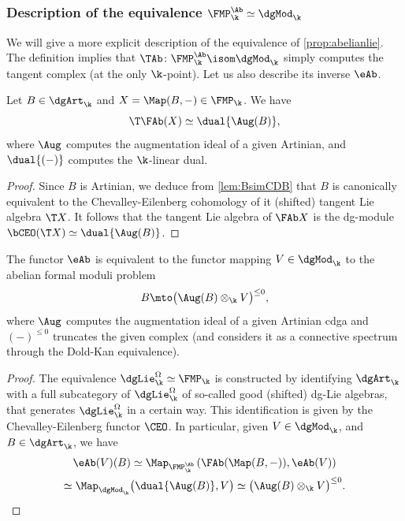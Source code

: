 \subsubsection{Description of the equivalence $\FMP_\k^\Ab \simeq \dgMod_\k$}

We will give a more expli\-cit description of the equivalence of \autoref{prop:abelianlie}. The definition implies that $\TAb \colon \FMP_\k^\Ab \isom \dgMod_\k$ simply computes the tangent complex (at the only $\k$\nobreakdash-point). Let us also describe its inverse $\eAb$.

\begin{lem}\label{lem:abelianization}
Let $B \in \dgArt_\k$ and $X = \Map(B,-) \in \FMP_\k$.
We have
\[
\T \FAb(X) \simeq \dual{\Aug(B)},
\]
where $\Aug$ computes the augmentation ideal of a given Artinian, and $\dual{(-)}$ computes the $\k$-linear dual.
\end{lem}

\begin{proof}
Since $B$ is Artinian, we deduce from \autoref{lem:BsimCDB} that $B$ is canonically equivalent to the Chevalley-Eilenberg cohomology of it (shifted) tangent Lie algebra $\T X$.
It follows that the tangent Lie algebra of $\FAb X$ is the dg-module $\bCEO(\T X) \simeq \dual{\Aug (B)}$.
\end{proof}

\begin{prop}\label{prop:calceAb}
The functor $\eAb$ is equivalent to the functor mapping $V \in \dgMod_\k$ to the abelian formal moduli problem
\[
B \mto \bigl(\Aug(B) \otimes_\k V \bigr)^{\leq 0},
\]
where $\Aug$ computes the augmentation ideal of a given Artinian cdga and $(-)^{\leq 0}$ truncates the given complex (and considers it as a connective spectrum through the Dold-Kan equivalence).
\end{prop}

\begin{proof}
The equivalence $\dgLie^\Omega_\k \simeq \FMP_\k$ is constructed by identifying $\dgArt_\k$ with a full subcategory of $\dgLie^\Omega_\k$ of so-called good (shifted) dg-Lie algebras, that generates $\dgLie_\k^\Omega$ in a certain way. This identification is given by the Chevalley-Eilenberg functor $\CEO$.
In particular, given $V \in \dgMod_\k$, and $B \in \dgArt_\k$, we have
\begin{multline*}
\eAb(V)(B) \simeq \Map_{\FMP_\k^\Ab}\left(\FAb(\Map(B,-)), \eAb(V)\right) \\ \simeq \Map_{\dgMod_\k}\bigl( \dual{\Aug(B)}, V\bigr) \simeq \bigl(\Aug(B) \otimes_\k V \bigr)^{\leq 0}.\qedhere
\end{multline*}
\end{proof}

